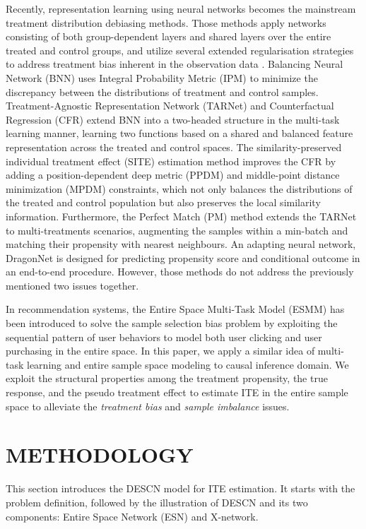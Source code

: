 \documentclass[sigconf]{acmart}
\begin{document}
Recently, representation learning using neural networks becomes the mainstream treatment distribution debiasing methods. Those methods apply networks consisting of both group-dependent layers and shared layers over the entire treated and control groups, and utilize several extended regularisation strategies to address treatment bias inherent in the observation data \cite{Schwab2019a}. Balancing Neural Network (BNN) \cite{Fredrik2016-co} uses Integral Probability Metric (IPM) to minimize the discrepancy between the distributions of treatment and control samples. Treatment-Agnostic Representation Network (TARNet) and Counterfactual Regression (CFR) \cite{Shalit2017} extend BNN into a two-headed structure in the multi-task learning manner, learning two functions based on a shared and balanced feature representation across the treated and control spaces. The similarity-preserved individual treatment effect (SITE) estimation method \cite{Yao2018} improves the CFR by adding a position-dependent deep metric (PPDM) and middle-point distance minimization (MPDM) constraints, which not only balances the distributions of the treated and control population but also preserves the local similarity information. Furthermore, the Perfect Match (PM) method \cite{Schwab2019b} extends the TARNet to multi-treatments scenarios, augmenting the samples within a min-batch and matching their propensity with nearest neighbours. An adapting neural network, DragonNet \cite{Shi2019} is designed for predicting propensity score and conditional outcome in an end-to-end procedure. However, those methods do not address the previously mentioned two issues together.

In recommendation systems, the Entire Space Multi-Task Model (ESMM) \cite{Ma2018EntireSM} has been introduced to solve the sample selection bias problem by exploiting the sequential pattern of user behaviors to model both user clicking and user purchasing in the entire space. In this paper, we apply a similar idea of multi-task learning and entire sample space modeling to causal inference domain. We exploit the structural properties among the treatment propensity, the true response, and the pseudo treatment effect to estimate ITE in the entire sample space to alleviate the \textit{treatment bias} and \textit{sample imbalance} issues.


\section{METHODOLOGY}
This section introduces the DESCN model for ITE estimation. It starts with the problem definition, followed by the illustration of DESCN and its two components: Entire Space Network (ESN) and X-network.
\end{document}
